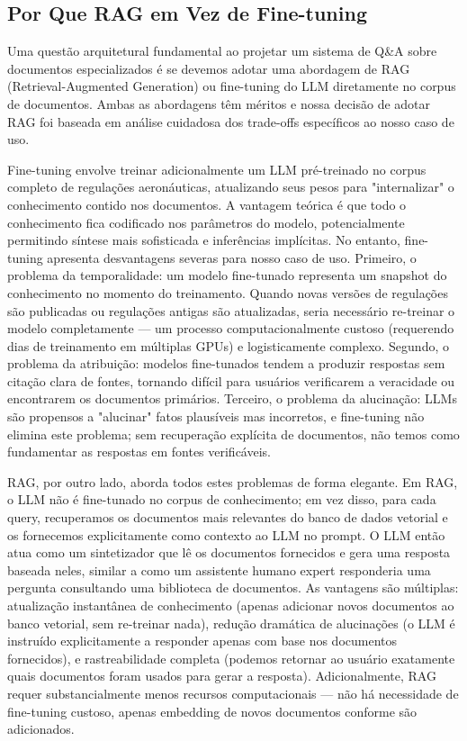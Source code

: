 \documentclass[12pt,a4paper]{article}
\begin{document}
\subsection{Por Que RAG em Vez de Fine-tuning}

Uma questão arquitetural fundamental ao projetar um sistema de Q&A sobre documentos especializados é se devemos adotar uma abordagem de RAG (Retrieval-Augmented Generation) ou fine-tuning do LLM diretamente no corpus de documentos. Ambas as abordagens têm méritos e nossa decisão de adotar RAG foi baseada em análise cuidadosa dos trade-offs específicos ao nosso caso de uso.

Fine-tuning envolve treinar adicionalmente um LLM pré-treinado no corpus completo de regulações aeronáuticas, atualizando seus pesos para "internalizar" o conhecimento contido nos documentos. A vantagem teórica é que todo o conhecimento fica codificado nos parâmetros do modelo, potencialmente permitindo síntese mais sofisticada e inferências implícitas. No entanto, fine-tuning apresenta desvantagens severas para nosso caso de uso. Primeiro, o problema da temporalidade: um modelo fine-tunado representa um snapshot do conhecimento no momento do treinamento. Quando novas versões de regulações são publicadas ou regulações antigas são atualizadas, seria necessário re-treinar o modelo completamente — um processo computacionalmente custoso (requerendo dias de treinamento em múltiplas GPUs) e logisticamente complexo. Segundo, o problema da atribuição: modelos fine-tunados tendem a produzir respostas sem citação clara de fontes, tornando difícil para usuários verificarem a veracidade ou encontrarem os documentos primários. Terceiro, o problema da alucinação: LLMs são propensos a "alucinar" fatos plausíveis mas incorretos, e fine-tuning não elimina este problema; sem recuperação explícita de documentos, não temos como fundamentar as respostas em fontes verificáveis.

RAG, por outro lado, aborda todos estes problemas de forma elegante. Em RAG, o LLM não é fine-tunado no corpus de conhecimento; em vez disso, para cada query, recuperamos os documentos mais relevantes do banco de dados vetorial e os fornecemos explicitamente como contexto ao LLM no prompt. O LLM então atua como um sintetizador que lê os documentos fornecidos e gera uma resposta baseada neles, similar a como um assistente humano expert responderia uma pergunta consultando uma biblioteca de documentos. As vantagens são múltiplas: atualização instantânea de conhecimento (apenas adicionar novos documentos ao banco vetorial, sem re-treinar nada), redução dramática de alucinações (o LLM é instruído explicitamente a responder apenas com base nos documentos fornecidos), e rastreabilidade completa (podemos retornar ao usuário exatamente quais documentos foram usados para gerar a resposta). Adicionalmente, RAG requer substancialmente menos recursos computacionais — não há necessidade de fine-tuning custoso, apenas embedding de novos documentos conforme são adicionados.
\end{document}
